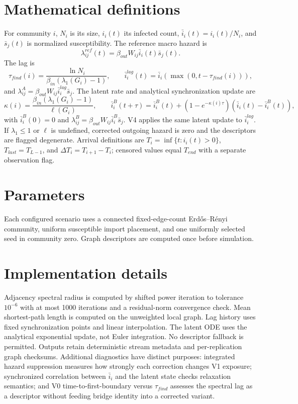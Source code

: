 \documentclass[11pt]{article}
\begin{document}
\section{Mathematical definitions}
For community $i$, $N_i$ is its size, $i_i(t)$ its infected count,
$\bar i_i(t)=i_i(t)/N_i$, and $\bar s_j(t)$ is normalized susceptibility.
The reference macro hazard is
\[\lambda^{ref}_{ij}(t)=\beta_{out}W_{ij}\bar i_i(t)\bar s_j(t).\]
The lag is
\[\tau_{find}(i)=\frac{\ln N_i}{\beta_{in}(\lambda_1(G_i)-1)},\qquad
  \bar i_i^{lag}(t)=\bar i_i(\max(0,t-\tau_{find}(i))),\]
and $\lambda^A_{ij}=\beta_{out}W_{ij}\bar i_i^{lag}\bar s_j$.
The latent rate and analytical synchronization update are
\[\kappa(i)=\frac{\beta_{in}(\lambda_1(G_i)-1)}{\ell(G_i)},\qquad
\bar i_i^B(t+\tau)=\bar i_i^B(t)+(1-e^{-\kappa(i)\tau})
  (\bar i_i(t)-\bar i_i^B(t)),\]
with $\bar i_i^B(0)=0$ and $\lambda^B_{ij}=\beta_{out}W_{ij}\bar i_i^B\bar s_j$.
V4 applies the same latent update to $\bar i_i^{lag}$. If $\lambda_1\le1$ or
$\ell$ is undefined, corrected outgoing hazard is zero and the descriptors are
flagged degenerate. Arrival definitions are $T_i=\inf\{t:i_i(t)>0\}$,
$T_{last}=T_{L-1}$, and $\Delta T_i=T_{i+1}-T_i$; censored values equal
$T_{end}$ with a separate observation flag.

\section{Parameters}
Each configured scenario uses a connected fixed-edge-count Erd\H{o}s--R\'enyi
community, uniform susceptible import placement, and one uniformly selected seed
in community zero. Graph descriptors are computed once before simulation.

\section{Implementation details}
Adjacency spectral radius is computed by shifted power iteration to tolerance
$10^{-6}$ with at most 1000 iterations and a residual-norm convergence check.
Mean shortest-path length is computed on the unweighted local graph. Lag history
uses fixed synchronization points and linear interpolation. The latent ODE uses
the analytical exponential update, not Euler integration. No descriptor fallback
is permitted. Outputs retain deterministic stream metadata and per-replication
graph checksums. Additional diagnostics have distinct purposes: integrated hazard
suppression measures how strongly each correction changes V1 exposure; synchronized
correlation between $\bar i_i$ and the latent state checks relaxation semantics; and
V0 time-to-first-boundary versus $\tau_{find}$ assesses the spectral lag as a
descriptor without feeding bridge identity into a corrected variant.
\end{document}
